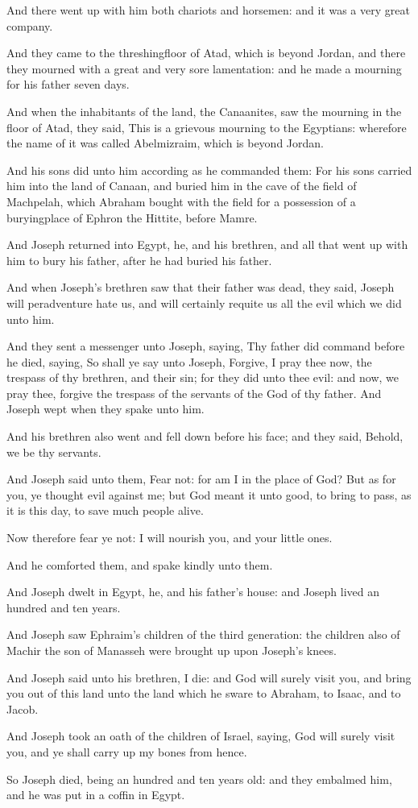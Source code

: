 \verse And there went up with him both chariots and horsemen: and it was
a very great company.

\verse And they came to the threshingfloor of Atad, which is beyond
Jordan, and there they mourned with a great and very sore lamentation:
and he made a mourning for his father seven days.

\verse And when the inhabitants of the land, the Canaanites, saw the
mourning in the floor of Atad, they said, This is a grievous mourning
to the Egyptians: wherefore the name of it was called Abelmizraim,
which is beyond Jordan.

\verse And his sons did unto him according as he commanded them: \verse
For his sons carried him into the land of Canaan, and buried him in
the cave of the field of Machpelah, which Abraham bought with the
field for a possession of a buryingplace of Ephron the Hittite, before
Mamre.

\verse And Joseph returned into Egypt, he, and his brethren, and all
that went up with him to bury his father, after he had buried his
father.

\verse And when Joseph's brethren saw that their father was dead, they
said, Joseph will peradventure hate us, and will certainly requite us
all the evil which we did unto him.

\verse And they sent a messenger unto Joseph, saying, Thy father did
command before he died, saying, \verse So shall ye say unto Joseph,
Forgive, I pray thee now, the trespass of thy brethren, and their sin;
for they did unto thee evil: and now, we pray thee, forgive the
trespass of the servants of the God of thy father. And Joseph wept
when they spake unto him.

\verse And his brethren also went and fell down before his face; and
they said, Behold, we be thy servants.

\verse And Joseph said unto them, Fear not: for am I in the place of
God?  \verse But as for you, ye thought evil against me; but God meant
it unto good, to bring to pass, as it is this day, to save much people
alive.

\verse Now therefore fear ye not: I will nourish you, and your little
ones.

And he comforted them, and spake kindly unto them.

\verse And Joseph dwelt in Egypt, he, and his father's house: and
Joseph lived an hundred and ten years.

\verse And Joseph saw Ephraim's children of the third generation: the
children also of Machir the son of Manasseh were brought up upon
Joseph's knees.

\verse And Joseph said unto his brethren, I die: and God will surely
visit you, and bring you out of this land unto the land which he sware
to Abraham, to Isaac, and to Jacob.

\verse And Joseph took an oath of the children of Israel, saying, God
will surely visit you, and ye shall carry up my bones from hence.

\verse So Joseph died, being an hundred and ten years old: and they
embalmed him, and he was put in a coffin in Egypt.

